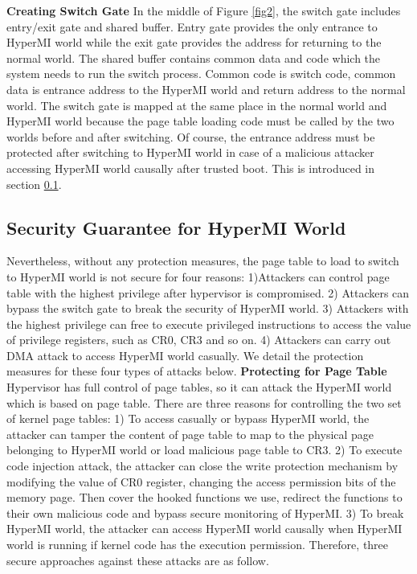\documentclass[conference]{IEEEtran}
\begin{document}
\textbf{Creating Switch Gate}
In the middle of Figure \ref{fig2}, the switch gate includes entry/exit gate and shared buffer. Entry gate provides the only entrance to HyperMI world while the exit gate provides the address for returning to the normal world. The shared buffer contains common data and code which the system needs to run the switch process. Common code is switch code, common data is entrance address to the HyperMI world and return address to the normal world. The switch gate is mapped at the same place in the normal world and HyperMI world because the page table loading code must be called by the two worlds before and after switching. Of course, the entrance address must be protected after switching to HyperMI world in case of a malicious attacker accessing HyperMI world causally after trusted boot. This is introduced in section \ref{SG}.
\subsection{Security Guarantee for HyperMI World}\label {SG}
Nevertheless, without any protection measures, the page table to load to switch to HyperMI world is not secure for four reasons: 1)Attackers can control page table with the highest privilege after hypervisor is compromised. 2) Attackers can bypass the switch gate to break the security of HyperMI world. 3) Attackers with the highest privilege can free to execute privileged instructions to access the value of privilege registers, such as CR0, CR3 and so on. 4) Attackers can carry out DMA attack to access HyperMI world casually.
We detail the protection measures for these four types of attacks below.
\textbf{Protecting for Page Table}
Hypervisor has full control of page tables, so it can attack the HyperMI world which is based on page table.
There are three reasons for controlling the two set of kernel page tables: 1) To access casually or bypass HyperMI world, the attacker can tamper the content of page table to map to the physical page belonging to HyperMI world or load malicious page table to CR3. 2) To execute code injection attack, the attacker can close the write protection mechanism by modifying the value of CR0 register, changing the access permission bits of the memory page. Then cover the hooked functions we use, redirect the functions to their own malicious code and bypass secure monitoring of HyperMI. 3) To break HyperMI world, the attacker can access HyperMI world causally when HyperMI world is running if kernel code has the execution permission. Therefore, three secure approaches against these attacks are as follow.
\end{document}
